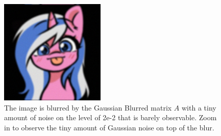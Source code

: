 \documentclass[]{article}
\theoremstyle{definition}
\begin{document}
        \begin{figure}[H]
            \centering
            \includegraphics*[width=5cm]{blurred_img.jpg}
            \caption{The image is blurred by the Gaussian Blurred matrix $A$ with a tiny amount of noise on the level of 2e-2 that is barely observable. Zoom in to observe the tiny amount of Gaussian noise on top of the blur.}
            \label{fig:blurred_alto}
        \end{figure}
\end{document}
